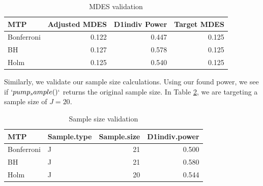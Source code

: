 \documentclass[
]{jss}
\begin{document}
\begin{table}[h!]
\centering
\begin{tabular}{lrrr}
MTP & Adjusted MDES & D1indiv Power & Target MDES\\
\hline
Bonferroni & 0.122 & 0.447 & 0.125\\
BH & 0.127 & 0.578 & 0.125\\
Holm & 0.125 & 0.540 & 0.125
\end{tabular}
\label{tab:mdes}
\caption{MDES validation}
\end{table}

Similarly, we validate our sample size calculations. Using our found
power, we see if \(`pump_sample()`\) returns the original sample size.
In Table \ref{tab:ss}, we are targeting a sample size of \(J = 20\).

\begin{table}[h!]
\centering
\begin{tabular}{llrr}
MTP & Sample.type & Sample.size & D1indiv.power\\
\hline
Bonferroni & J & 21 & 0.500\\
BH & J & 21 & 0.580\\
Holm & J & 20 & 0.544
\end{tabular}
\label{tab:ss}
\caption{Sample size validation}
\end{table}
\end{document}
